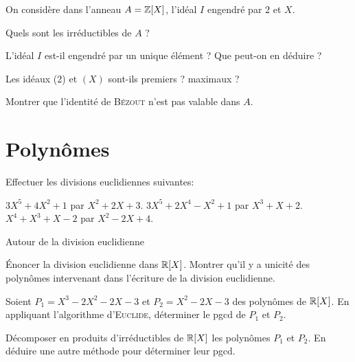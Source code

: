 \documentclass[french]{report}
\begin{document}
\begin{exo}
    On considère dans l'anneau \(A=\mathbb{Z}[X]\), l'idéal \(I\) engendré par \(2\) et \(X\).
    \begin{q}{1}
        Quels sont les irréductibles de \(A\) ?
    \end{q}
    \begin{q}{2}
        L'idéal \(I\) est-il engendré par un unique élément ? Que peut-on en déduire ?
    \end{q}
    \begin{q}{3}
        Les idéaux (2) et \((X)\) sont-ils premiers ? maximaux ?
    \end{q}
    \begin{q}{4}
        Montrer que l'identité de \textsc{Bézout} n'est pas valable dans \(A\).
    \end{q}
\end{exo}

\section*{Polynômes}

\begin{exo}
    Effectuer les divisions euclidiennes suivantes:
    \begin{enumerate}
        \itt \(3X^5+4X^2+1\) par \(X^2+2X+3\).
        \itt \(3X^5+2X^4-X^2+1\) par \(X^3+X+2\).
        \itt \(X^4+X^3+X-2\) par \(X^2-2X+4\).
    \end{enumerate}
\end{exo}

\begin{exo} Autour de la division euclidienne
    \begin{q}{1}
        Énoncer la division euclidienne dans \(\mathbb{R}[X]\). Montrer qu'il y a unicité des
        polynômes intervenant dans l'écriture de la division euclidienne.
    \end{q}
    \begin{q}{2}
        Soient \(P_1=X^3-2X^2-2X-3\) et \(P_2=X^2-2X-3\) des polynômes de \(\mathbb{R}[X]\).
        En appliquant l'algorithme d'\textsc{Euclide}, déterminer le pgcd de \(P_1\)
        et \(P_2\).
    \end{q}
    \begin{q}{3}
        Décomposer en produits d'irréductibles de \(\mathbb{R}[X]\) les polynômes
        \(P_1\) et \(P_2\). En déduire une autre méthode pour déterminer leur pgcd.
    \end{q}
\end{exo}
\end{document}
